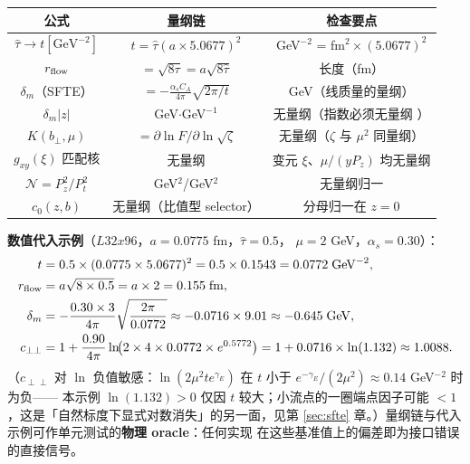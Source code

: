 \documentclass[11pt,a4paper]{ctexart}
\newcommand{\abs}[1]{\lvert #1\rvert}
\newcommand{\bperp}{b_{\perp}}
\newcommand{\zzh}{\widehat{\tau}}
\begin{document}
\begin{center}
\small
\begin{tabular}{c c c}
\toprule
\textbf{公式} & \textbf{量纲链} & \textbf{检查要点} \\
\midrule
$\zzh\to t[\mathrm{GeV}^{-2}]$ &
$t=\zzh(a\times5.0677)^2$ & GeV$^{-2}$ = fm$^2\times(5.0677)^2$ \\
$r_{\rm flow}$ & $=\sqrt{8\tau}=a\sqrt{8\zzh}$ & 长度（fm） \\
$\delta_m$（SFTE） &
$=-\frac{\alpha_sC_A}{4\pi}\sqrt{2\pi/t}$ & GeV（线质量的量纲） \\
$\delta_m\abs z$ & GeV$\cdot$GeV$^{-1}$ & 无量纲（指数必须无量纲
） \\
$K(\bperp,\mu)$ & $=\partial\ln F/\partial\ln\sqrt\zeta$ &
无量纲（$\zeta$ 与 $\mu^2$ 同量纲） \\
$g_{xy}(\xi)$ 匹配核 & 无量纲 & 变元 $\xi$、$\mu/(yP_z)$ 均无量纲
 \\
$\mathcal N=P_z^2/P_t^2$ & GeV$^2$/GeV$^2$ & 无量纲归一 \\
$c_0(z,b)$ & 无量纲（比值型 selector） & 分母归一在 $z=0$ \\
\bottomrule
\end{tabular}
\end{center}
\textbf{数值代入示例}（$L32x96$，$a=0.0775$ fm，$\zzh=0.5$，
$\mu=2$ GeV，$\alpha_s=0.30$）：
\begin{align}
t &= 0.5\times(0.0775\times5.0677)^2
= 0.5\times0.1543 = 0.0772\;\mathrm{GeV}^{-2}, \notag\\
r_{\rm flow} &= a\sqrt{8\times0.5} = a\times2 = 0.155\;\mathrm{fm}, \notag\\
\delta_m &= -\frac{0.30\times3}{4\pi}\sqrt{\frac{2\pi}{0.0772}}
\approx -0.0716\times9.01 \approx -0.645\;\mathrm{GeV}, \notag\\
c_{\perp\perp} &= 1+\frac{0.90}{4\pi}
\ln\!\bigl(2\times4\times0.0772\times e^{0.5772}\bigr)
=1+0.0716\times\ln(1.132) \approx 1.0088.
\end{align}
（$c_{\perp\perp}$ 对 $\ln$ 负值敏感：$\ln(2\mu^2 t e^{\gamma_E})$
在 $t$ 小于 $e^{-\gamma_E}/(2\mu^2)\approx0.14$ GeV$^{-2}$ 时为负——
本示例 $\ln(1.132)>0$ 仅因 $t$ 较大；小流点的一圈端点因子可能
$<1$，这是「自然标度下显式对数消失」的另一面，见第 \ref{sec:sfte}
章。）量纲链与代入示例可作单元测试的\textbf{物理 oracle}：任何实现
在这些基准值上的偏差即为接口错误的直接信号。
\end{document}
